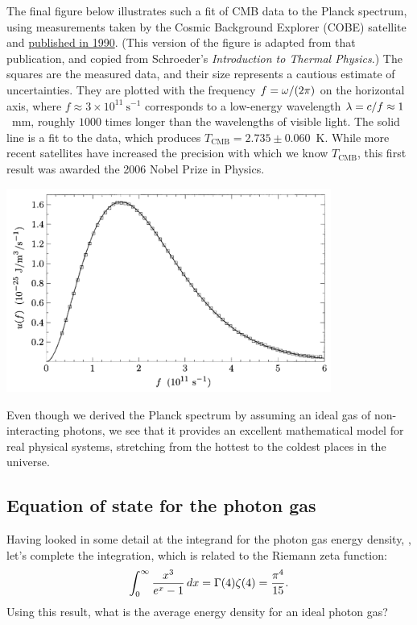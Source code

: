 The final figure below illustrates such a fit of CMB data to the Planck spectrum, using measurements taken by the Cosmic Background Explorer (COBE) satellite and \href{https://doi.org/10.1086/185717}{published in 1990}.
(This version of the figure is adapted from that publication, and copied from Schroeder's \textit{Introduction to Thermal Physics}.)
The squares are the measured data, and their size represents a cautious estimate of uncertainties.
They are plotted with the frequency $f = \omega / (2\pi)$ on the horizontal axis, where $f \approx 3\times 10^{11}~\text{s}^{-1}$ corresponds to a low-energy wavelength $\lambda = c / f \approx 1$~mm, roughly $1000$ times longer than the wavelengths of visible light.
The solid line is a fit to the data, which produces $T_{\text{CMB}} = 2.735 \pm 0.060$~K.
While more recent satellites have increased the precision with which we know $T_{\text{CMB}}$, this first result was awarded the 2006 Nobel Prize in Physics. \\[-24 pt]
\begin{center}\includegraphics[width=0.8\textwidth]{figs/unit08_COBE.pdf}\end{center}

\begin{shaded}
  Even though we derived the Planck spectrum by assuming an ideal gas of non-interacting photons, we see that it provides an excellent mathematical model for real physical systems, stretching from the hottest to the coldest places in the universe.
\end{shaded}



\subsection{\label{sec:photon_eos}Equation of state for the photon gas}
Having looked in some detail at the integrand for the photon gas energy density, , let's complete the integration, which is related to the Riemann zeta function:
\begin{equation*}
  \int_0^{\infty} \frac{x^3}{e^x - 1} \mathop{dx} = \Gamma(4) \zeta(4) = \frac{\pi^4}{15}.
\end{equation*}
Using this result, what is the average energy density for an ideal photon gas?
\begin{mdframed}
  \ \\[85 pt]
\end{mdframed}

